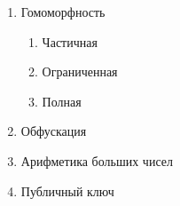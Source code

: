 \begin{enumerate}
\begin{enumerate}
\begin{enumerate}
		            \end{enumerate}
	            \item Гомоморфность
		            \begin{enumerate}
	                        \item Частичная
	                        \item Ограниченная
                              \item Полная
		            \end{enumerate}
	            \item Обфускация
	            \item Арифметика больших чисел
	            \item Публичный ключ
		\end{enumerate}
    \end{enumerate}


